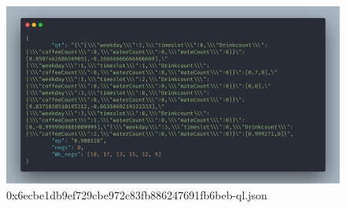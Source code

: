 \begin{figure}[th!]
	\centering
	\includegraphics[width=.9\columnwidth]{./Abbildungen/Kapitel_03/usr_json.png}
	\caption{0x6ecbe1db9ef729cbe972c83fb886247691fb6beb-ql.json}
	\label{img:abb2}
\end{figure}

